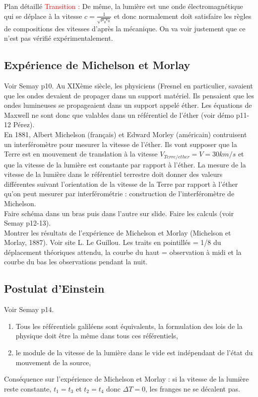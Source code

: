 \begin{reportBlock}{Plan détaillé}
\textcolor{red}{Transition :} De même, la lumière est une onde électromagnétique qui se déplace à la vitesse $c=\frac{1}{\sqrt{\mu_0\epsilon_0}}$ et donc normalement doit satisfaire les règles de compositions des vitesses d'après la mécanique. On va voir justement que ce n'est pas vérifié expérimentalement.

\subsection{Expérience de Michelson et Morlay}
Voir Semay p10. Au XIXème siècle, les physiciens (Fresnel en particulier, savaient que les ondes devaient de propager dans un support matériel. Ils pensaient que les ondes lumineuses se propageaient dans un support appelé éther. Les équations de Maxwell ne sont donc que valables dans un référentiel de l'éther (voir démo p11-12 Pérez). \\
En 1881, Albert Michelson (français) et Edward Morley (américain) contruisent un interféromètre pour mesurer la vitesse de l'éther. Ils vont supposer que la Terre est en mouvement de translation à la vitesse $V_{Terre/ether}=V=30km/s$ et que la vitesse de la lumière est constante par rapport à l'éther. La mesure de la vitesse de la lumière dans le référentiel terrestre doit donner des valeurs différentes suivant l'orientation de la vitesse de la Terre par rapport à l'éther qu'on peut mesurer par interférométrie : construction de l'interféromètre de Michelson.\\

Faire schéma dans un bras puis dans l'autre sur slide. Faire les calculs (voir Semay p12-13). \\


Montrer les résultats de l'expérience de Michelson et Morlay (Michelson et Morlay, 1887). Voir site L. Le Guillou. Les traits en pointillés = 1/8 du déplacement théoriques attendu, la courbe du haut = observation à midi et la courbe du bas les observations pendant la nuit.

\subsection{Postulat d'Einstein}
Voir Semay p14. \begin{enumerate}
    \item Tous les référentiels galiléens sont équivalents, la formulation des lois de la physique doit être la même dans tous ces référentiels,
    \item le module de la vitesse de la lumière dans le vide est indépendant de l'état du mouvement de la source,
\end{enumerate}
Conséquence sur l'expérience de Michelson et Morlay : si la vitesse de la lumière reste constante, $t_1=t_3$ et $t_2=t_4$ donc $\Delta T=0$, les franges ne se décalent pas.\\


\end{reportBlock}
